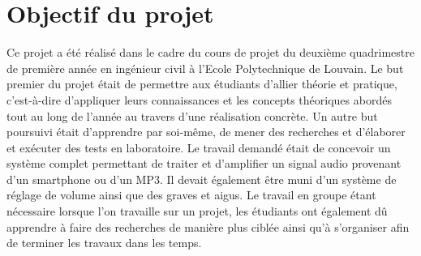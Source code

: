 \section{Objectif du projet}

Ce projet a été réalisé dans le cadre du cours de projet du deuxième quadrimestre de première année en ingénieur civil à l'Ecole Polytechnique de Louvain. Le but premier du projet était de permettre aux étudiants d’allier théorie et pratique, c'est-à-dire d'appliquer leurs connaissances et les concepts théoriques abordés tout au long de l'année au travers d'une réalisation concrète. Un autre but poursuivi était d'apprendre par soi-même, de mener des recherches et d'élaborer et exécuter des tests en laboratoire.
Le travail demandé était de concevoir un système complet permettant de traiter et d'amplifier un signal audio provenant d'un smartphone ou d'un MP3. Il devait également être muni d’un système de réglage de volume ainsi que des graves et aigus.
Le travail en groupe étant nécessaire lorsque l’on travaille sur un projet, les étudiants ont également dû apprendre à faire des recherches de manière plus ciblée ainsi qu’à s'organiser afin de terminer les travaux dans les temps.

